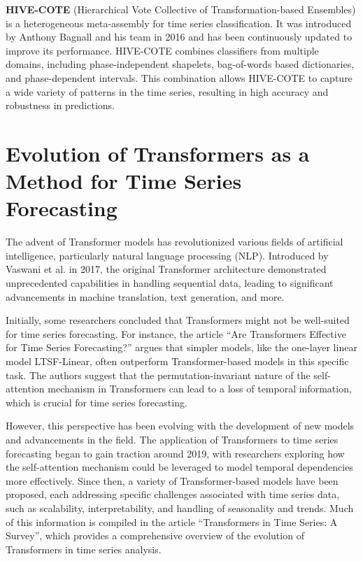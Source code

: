 \textbf{HIVE-COTE} (Hierarchical Vote Collective of Transformation-based Ensembles) is a heterogeneous meta-assembly for time series classification. It was introduced by Anthony Bagnall and his team in 2016 and has been continuously updated to improve its performance. HIVE-COTE combines classifiers from multiple domains, including phase-independent shapelets, bag-of-words based dictionaries, and phase-dependent intervals. This combination allows HIVE-COTE to capture a wide variety of patterns in the time series, resulting in high accuracy and robustness in predictions.




\section{Evolution of Transformers as a Method for Time Series Forecasting}

The advent of Transformer models has revolutionized various fields of artificial intelligence, particularly natural language processing (NLP). Introduced by Vaswani et al. in 2017\cite{vaswani2023attention}, the original Transformer architecture demonstrated unprecedented capabilities in handling sequential data, leading to significant advancements in machine translation, text generation, and more. 

Initially, some researchers concluded that Transformers might not be well-suited for time series forecasting. For instance, the article “Are Transformers Effective for Time Series Forecasting?”\cite{zeng2022transformerseffectivetimeseries} argues that simpler models, like the one-layer linear model LTSF-Linear, often outperform Transformer-based models in this specific task. The authors suggest that the permutation-invariant nature of the self-attention mechanism in Transformers can lead to a loss of temporal information, which is crucial for time series forecasting.

However, this perspective has been evolving with the development of new models and advancements in the field. The application of Transformers to time series forecasting began to gain traction around 2019, with researchers exploring how the self-attention mechanism could be leveraged to model temporal dependencies more effectively. Since then, a variety of Transformer-based models have been proposed, each addressing specific challenges associated with time series data, such as scalability, interpretability, and handling of seasonality and trends. Much of this information is compiled in the article “Transformers in Time Series: A Survey”\cite{wen2023transformerstimeseriessurvey}, which provides a comprehensive overview of the evolution of Transformers in time series analysis.

